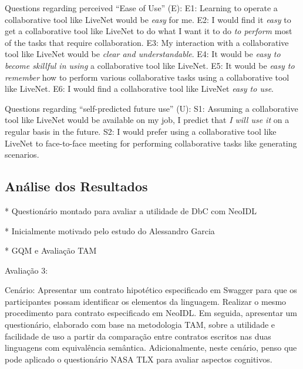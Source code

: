 Questions regarding perceived “Ease of Use” (E):
E1: Learning to operate a collaborative tool like LiveNet
would be \emph{easy} for me.
E2: I would find it \emph{easy} to get a collaborative tool like LiveNet
to do what I want it to do \emph{to perform} most of the tasks that
require collaboration.
E3: My interaction with a collaborative tool like LiveNet would
be \emph{clear and understandable}.
E4: It would be \emph{easy to become skillful in using} a collaborative
tool like LiveNet.
E5: It would be \emph{easy to remember} how to perform various
collaborative tasks using a collaborative tool like LiveNet.
E6: I would find a collaborative tool like LiveNet \emph{easy to use}.

Questions regarding “self-predicted future use” (U):
S1: Assuming a collaborative tool like LiveNet would be available
on my job, I predict that \emph{I will use it} on a regular basis
in the future.
S2: I would prefer using a collaborative tool like LiveNet to
face-to-face meeting for {performing collaborative tasks}
like generating scenarios.

\cite{babar2007evaluating}







\subsection{Análise dos Resultados}
\label{AnaliseQuestionario}
\vspace{-6mm}


* Questionário montado para avaliar a utilidade de DbC com NeoIDL

* Inicialmente motivado pelo estudo do Alessandro Garcia

* GQM e Avaliação TAM

Avaliação 3:



Cenário: Apresentar um contrato hipotético especificado em Swagger para que os participantes possam identificar os elementos da linguagem. Realizar o mesmo procedimento para contrato especificado em NeoIDL. Em seguida, apresentar um questionário, elaborado com base na metodologia TAM, sobre a utilidade e facilidade de uso a partir da comparação entre contratos escritos nas duas linguagens com equivalência semântica.
Adicionalmente, neste cenário, penso que pode aplicado o questionário NASA TLX para avaliar aspectos cognitivos.






